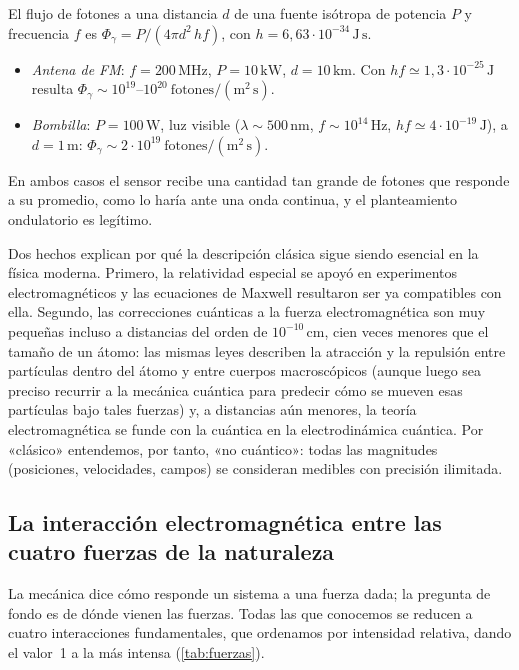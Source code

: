 \begin{ejemplo}\label{ej:fotones}
El flujo de fotones a una distancia $d$ de una fuente isótropa de potencia $P$ y
frecuencia $f$ es $\Phi_\gamma=P/(4\pi d^{2}\,hf)$, con $h=6{,}63\cdot10^{-34}\,\mathrm{J\,s}$.
\begin{itemize}
  \item \emph{Antena de FM}: $f=200\,\mathrm{MHz}$, $P=10\,\mathrm{kW}$, $d=10\,\mathrm{km}$.
        Con $hf\simeq1{,}3\cdot10^{-25}\,\mathrm{J}$ resulta
        $\Phi_\gamma\sim10^{19}$--$10^{20}\ \mathrm{fotones/(m^{2}\,s)}$.
  \item \emph{Bombilla}: $P=100\,\mathrm{W}$, luz visible ($\lambda\sim500\,\mathrm{nm}$,
        $f\sim10^{14}\,\mathrm{Hz}$, $hf\simeq4\cdot10^{-19}\,\mathrm{J}$), a $d=1\,\mathrm{m}$:
        $\Phi_\gamma\sim2\cdot10^{19}\ \mathrm{fotones/(m^{2}\,s)}$.
\end{itemize}
En ambos casos el sensor recibe una cantidad tan grande de fotones que responde a su
promedio, como lo haría ante una onda continua, y el planteamiento ondulatorio es
legítimo.
\end{ejemplo}

Dos hechos explican por qué la descripción clásica sigue siendo esencial en la física
moderna. Primero, la relatividad especial se apoyó en experimentos electromagnéticos y las
ecuaciones de Maxwell resultaron ser ya compatibles con ella. Segundo, las correcciones
cuánticas a la fuerza electromagnética son muy pequeñas incluso a distancias del orden de
$10^{-10}\,\mathrm{cm}$, cien veces menores que el tamaño de un átomo: las mismas leyes
describen la atracción y la repulsión entre partículas dentro del átomo y entre cuerpos
macroscópicos (aunque luego sea preciso recurrir a la mecánica cuántica para predecir cómo
se mueven esas partículas bajo tales fuerzas) y, a distancias aún menores, la teoría
electromagnética se funde con la cuántica en la electrodinámica cuántica. Por «clásico»
entendemos, por tanto, «no cuántico»: todas las magnitudes (posiciones, velocidades,
campos) se consideran medibles con precisión ilimitada.

\subsection{La interacción electromagnética entre las cuatro fuerzas de la naturaleza}\label{sec:fuerzas}
La mecánica dice cómo responde un sistema a una fuerza dada; la pregunta de fondo es de
dónde vienen las fuerzas. Todas las que conocemos se reducen a cuatro interacciones
fundamentales, que ordenamos por intensidad relativa, dando el valor~1 a la más intensa
(\cref{tab:fuerzas}).

